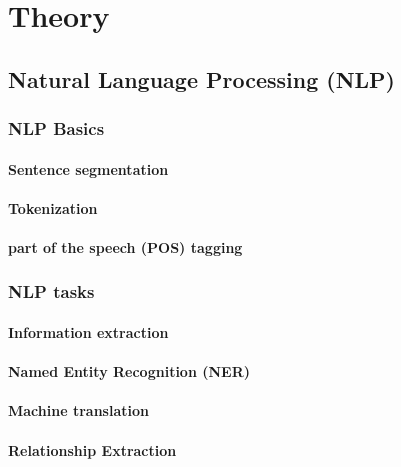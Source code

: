 \chapter{Theory}\label{chapter:theory}

\section{Natural Language Processing (NLP)}

\subsection{NLP Basics}\label{sec:NLPPipeline}

\subsubsection{Sentence segmentation}

\subsubsection{Tokenization}

\subsubsection{part of the speech (POS) tagging}

\subsection{NLP tasks}

\subsubsection{Information extraction}

\subsubsection{Named Entity Recognition (NER)}

\subsubsection{Machine translation}


\subsubsection{Relationship Extraction}

